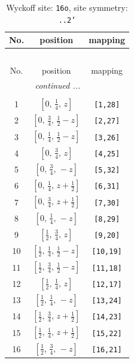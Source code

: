 \documentclass[fleqn,8pt]{jsarticle}
\begin{document}
\renewcommand{\arraystretch}{1.2}
\begin{longtable}{ccc}
\caption{Wyckoff site: {\tt 16o}, site symmetry: {\tt ..2'}}
 \\
 \hline \hline
No. & position & mapping \\ \hline \endfirsthead

\multicolumn{2}{l}{\tablename\ \thetable{}} \\
 \hline \hline
No. & position & mapping \\ \hline \endhead

 \hline \hline
\multicolumn{2}{r}{\footnotesize\it continued ...} \\ \endfoot

 \hline \hline
\multicolumn{2}{r}{} \\ \endlastfoot

1 & $\left[ 0,\, \frac{1}{4},\, z \right]$ & {\tt [1,28]} \\ \hline
2 & $\left[ 0,\, \frac{3}{4},\, \frac{1}{2} - z \right]$ & {\tt [2,27]} \\ \hline
3 & $\left[ 0,\, \frac{1}{4},\, \frac{1}{2} - z \right]$ & {\tt [3,26]} \\ \hline
4 & $\left[ 0,\, \frac{3}{4},\, z \right]$ & {\tt [4,25]} \\ \hline
5 & $\left[ 0,\, \frac{3}{4},\, - z \right]$ & {\tt [5,32]} \\ \hline
6 & $\left[ 0,\, \frac{1}{4},\, z + \frac{1}{2} \right]$ & {\tt [6,31]} \\ \hline
7 & $\left[ 0,\, \frac{3}{4},\, z + \frac{1}{2} \right]$ & {\tt [7,30]} \\ \hline
8 & $\left[ 0,\, \frac{1}{4},\, - z \right]$ & {\tt [8,29]} \\ \hline
9 & $\left[ \frac{1}{2},\, \frac{3}{4},\, z \right]$ & {\tt [9,20]} \\ \hline
10 & $\left[ \frac{1}{2},\, \frac{1}{4},\, \frac{1}{2} - z \right]$ & {\tt [10,19]} \\ \hline
11 & $\left[ \frac{1}{2},\, \frac{3}{4},\, \frac{1}{2} - z \right]$ & {\tt [11,18]} \\ \hline
12 & $\left[ \frac{1}{2},\, \frac{1}{4},\, z \right]$ & {\tt [12,17]} \\ \hline
13 & $\left[ \frac{1}{2},\, \frac{1}{4},\, - z \right]$ & {\tt [13,24]} \\ \hline
14 & $\left[ \frac{1}{2},\, \frac{3}{4},\, z + \frac{1}{2} \right]$ & {\tt [14,23]} \\ \hline
15 & $\left[ \frac{1}{2},\, \frac{1}{4},\, z + \frac{1}{2} \right]$ & {\tt [15,22]} \\ \hline
16 & $\left[ \frac{1}{2},\, \frac{3}{4},\, - z \right]$ & {\tt [16,21]} \\
\end{longtable}
\end{document}

